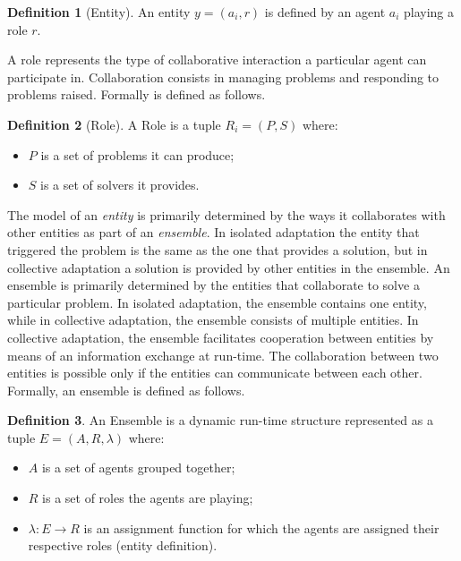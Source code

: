 \documentclass[journal]{IEEEtran}
\theoremstyle{definition}
\newtheorem{definition}{Definition}
\begin{document}
\begin{definition} [Entity] An entity $y = (a_i, r)$ is defined by an agent $a_i$ playing a role $r$.
\end{definition}

A role represents the type of collaborative interaction a particular agent can participate in. Collaboration consists in managing problems and  responding to problems raised. Formally is defined as follows.
 
\begin{definition}[Role] A Role is a tuple $R_i=(P, S)$ where:
\begin{itemize}
\item $P$ is a set of problems it can produce;
\item $S$ is a set of solvers it provides.
\end{itemize}
\end{definition}


The model of an \textit{entity} is primarily determined by the ways it collaborates with other entities as part of an \textit{ensemble}.  In isolated adaptation the entity that triggered the problem is the same as the one that provides a solution, but in collective adaptation a solution is provided by other entities in the ensemble. An ensemble is primarily determined by the entities that collaborate to solve a particular problem. In isolated adaptation, the ensemble contains one entity, while in collective adaptation, the ensemble consists of multiple entities. In collective adaptation, the ensemble facilitates cooperation between entities by means of an information exchange at run-time. The collaboration between two entities is possible only if the entities can communicate between each other.
Formally, an ensemble is defined as follows.

\begin{definition}
An Ensemble is a dynamic run-time structure represented as a tuple $E=(A, R, \lambda)$ where:
 \begin{itemize}
\item $A$ is a set of agents grouped together;
\item $R$ is a set of roles the agents are playing;
\item $\lambda: E \rightarrow R $ is an assignment function for which the agents are assigned their respective roles (entity definition).
 \end{itemize}
\end{definition}
\end{document}
